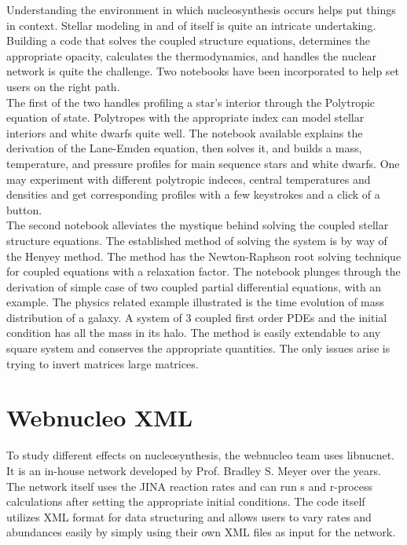\documentclass{article}
\begin{document}
Understanding the environment in which nucleosynthesis occurs helps put things in context. Stellar modeling in and of itself is quite 
an intricate undertaking. Building a code that solves the coupled structure equations, determines the appropriate opacity, calculates the thermodynamics, 
and handles the nuclear network is quite the challenge. Two notebooks have been incorporated to help set users on the right path.\\

The first of the two handles profiling a star's interior through the Polytropic equation of state. Polytropes with the appropriate index
can model stellar interiors and white dwarfs quite well. The notebook available explains the derivation of the Lane-Emden equation, then 
solves it, and builds a mass, temperature, and pressure profiles for main sequence stars and white dwarfs. One may experiment with different 
polytropic indeces, central temperatures and densities and get corresponding profiles with a few keystrokes and a click of a button.\\ 

The second notebook alleviates the mystique behind solving the coupled stellar structure equations. The established method of solving 
the system is by way of the Henyey method. The method has the Newton-Raphson root solving technique for coupled equations with a 
relaxation factor. The notebook plunges through the derivation of simple case of two coupled partial differential equations, with an example. 
The physics related example illustrated is the time evolution of mass distribution of a galaxy. A system of 3 coupled first order PDEs 
and the initial condition has all the mass in its halo. The method is easily extendable to any square system and conserves the appropriate 
quantities. The only issues arise is trying to invert matrices large matrices. 

\section*{Webnucleo XML}

To study different effects on nucleosynthesis, the webnucleo team uses libnucnet. It is an in-house network developed by Prof. Bradley 
S. Meyer over the years. The network itself uses the JINA reaction rates and can run s and r-process calculations after setting the 
appropriate initial conditions. The code itself utilizes XML format for data structuring and allows users to vary rates and abundances 
easily by simply using their own XML files as input for the network.\\
\end{document}
